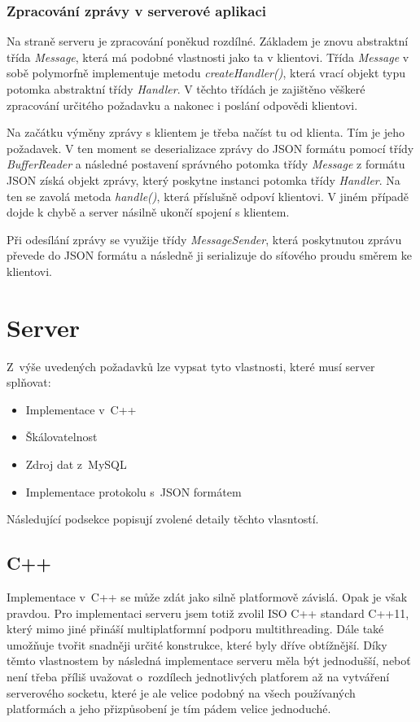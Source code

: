 \documentclass[thesis=B,czech]{FITthesis}[2013/10/20]
\begin{document}
\subsubsection{Zpracování zprávy v serverové aplikaci}

Na straně serveru je zpracování poněkud rozdílné. Základem je znovu abstraktní třída \textit{Message}, která má podobné vlastnosti jako ta v klientovi. Třída \textit{Message} v sobě polymorfně implementuje metodu \textit{createHandler()}, která vrací objekt typu potomka abstraktní třídy \textit{Handler}. V těchto třídách je zajištěno věškeré zpracování určitého požadavku a nakonec i poslání odpovědi klientovi.

Na začátku výměny zprávy s klientem je třeba načíst tu od klienta. Tím je jeho požadavek. V ten moment se deserializace zprávy do JSON formátu pomocí třídy \textit{BufferReader} a následné postavení správného potomka třídy \textit{Message} z formátu JSON získá objekt zprávy, který poskytne instanci potomka třídy \textit{Handler}. Na ten se zavolá metoda \textit{handle()}, která příslušně odpoví klientovi. V jiném případě dojde k chybě a server násilně ukončí spojení s klientem.

Při odesílání zprávy se využije třídy \textit{MessageSender}, která poskytnutou zprávu převede do JSON formátu a následně ji serializuje do síťového proudu směrem ke klientovi.

\section{Server}

Z~výše uvedených požadavků lze vypsat tyto vlastnosti, které musí server splňovat:

\begin{itemize}
  \item{Implementace v~C++}
  \item{Škálovatelnost}
  \item{Zdroj dat z~MySQL}
  \item{Implementace protokolu s~JSON formátem}
\end{itemize}

Následující podsekce popisují zvolené detaily těchto vlasntostí.

\subsection{C++}

Implementace v~C++ se může zdát jako silně platformově závislá. Opak je však pravdou. Pro implementaci serveru jsem totiž zvolil ISO C++ standard C++11, který mimo jiné přináší multiplatformní podporu multithreading. Dále také umožňuje tvořit snadněji určité konstrukce, které byly dříve obtížnější. Díky těmto vlastnostem by následná implementace serveru měla být jednodušší, neboť není třeba příliš uvažovat o~rozdílech jednotlivých platforem až na vytváření serverového socketu, které je ale velice podobný na všech používaných platformách a jeho přizpůsobení je tím pádem velice jednoduché.
\end{document}
